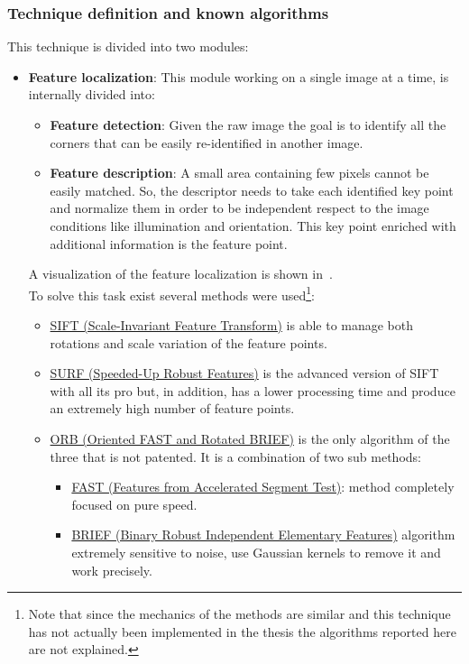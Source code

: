 \subsubsection*{Technique definition and known algorithms}
This technique is divided into two modules:
\begin{itemize}
	\item \textbf{Feature localization}: This module working on a single image at a time, is internally divided into:
	\begin{itemize}
		\item \textbf{Feature detection}: Given the raw image the goal is to identify all the corners that can be easily re-identified in another image.
		\item \textbf{Feature description}: A small area containing few pixels cannot be easily matched. So, the descriptor needs to take each identified key point and normalize them in order to be independent respect to the image conditions like illumination and orientation. This key point enriched with additional information is the feature point.
	\end{itemize}
	A visualization of the feature localization is shown in~.\\
	To solve this task exist several methods were used\footnote{Note that since the mechanics of the methods are similar and this technique has not actually been implemented in the thesis the algorithms reported here are not explained.}:
	\begin{itemize}
		\item \underline{SIFT (Scale-Invariant Feature Transform)}\cite{sift} is able to manage both rotations and scale variation of the feature points.
		\item \underline{SURF (Speeded-Up Robust Features)}\cite{surf} is the advanced version of SIFT with all its pro but, in addition, has a lower processing time and produce an extremely high number of feature points.
		\item \underline{ORB (Oriented FAST and Rotated BRIEF)}\cite{orb} is the only algorithm of the three that is not patented. It is a combination of two sub methods:
		\begin{itemize}[] %
			\item \underline{FAST (Features from Accelerated Segment Test)}:\cite{fast} method completely focused on pure speed.
			\item \underline{BRIEF (Binary Robust Independent Elementary Features)}\cite{brief} algorithm extremely sensitive to noise, use Gaussian kernels to remove it and work precisely.
		\end{itemize}
	\end{itemize}


\end{itemize}
